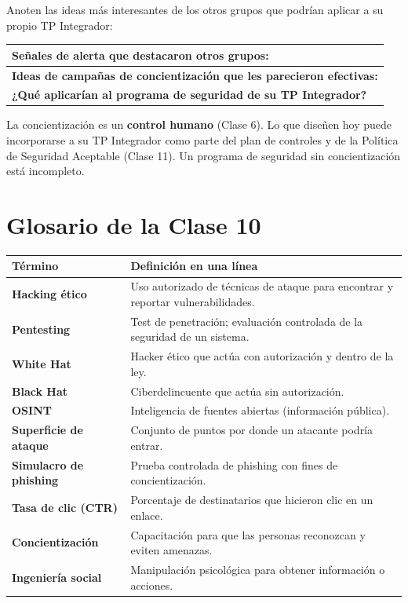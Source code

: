 \documentclass[12pt,a4paper]{article}
\renewcommand{\arraystretch}{1.25}
\begin{document}
\begin{cajaActividad}[title={Registro de la puesta en com\'un}]
Anoten las ideas m\'as interesantes de los otros grupos que podr\'ian aplicar a su propio TP Integrador:
\end{cajaActividad}
\vspace{4pt}
\renewcommand{\arraystretch}{1.6}
\begin{tabularx}{\textwidth}{|X|}
\hline
\textbf{Se\~nales de alerta que destacaron otros grupos:} \\[3cm]
\hline
\textbf{Ideas de campa\~nas de concientizaci\'on que les parecieron efectivas:} \\[3cm]
\hline
\textbf{¿Qu\'e aplicar\'ian al programa de seguridad de su TP Integrador?} \\[2.5cm]
\hline
\end{tabularx}

\begin{cajaNota}[title={Conexi\'on con el TP Integrador}]
La concientizaci\'on es un \textbf{control humano} (Clase 6). Lo que dise\~nen hoy puede incorporarse a su TP Integrador como parte del plan de controles y de la Pol\'itica de Seguridad Aceptable (Clase 11). Un programa de seguridad sin concientizaci\'on est\'a incompleto.
\end{cajaNota}

\newpage
\section{Glosario de la Clase 10}

\renewcommand{\arraystretch}{1.4}
\begin{tabularx}{\textwidth}{>{\bfseries}p{4.5cm}X}
\toprule
\textbf{T\'ermino} & \textbf{Definici\'on en una l\'inea} \\
\midrule
Hacking \'etico & Uso autorizado de t\'ecnicas de ataque para encontrar y reportar vulnerabilidades. \\
Pentesting & Test de penetraci\'on; evaluaci\'on controlada de la seguridad de un sistema. \\
White Hat & Hacker \'etico que act\'ua con autorizaci\'on y dentro de la ley. \\
Black Hat & Ciberdelincuente que act\'ua sin autorizaci\'on. \\
OSINT & Inteligencia de fuentes abiertas (informaci\'on p\'ublica). \\
Superficie de ataque & Conjunto de puntos por donde un atacante podr\'ia entrar. \\
Simulacro de phishing & Prueba controlada de phishing con fines de concientizaci\'on. \\
Tasa de clic (CTR) & Porcentaje de destinatarios que hicieron clic en un enlace. \\
Concientizaci\'on & Capacitaci\'on para que las personas reconozcan y eviten amenazas. \\
Ingenier\'ia social & Manipulaci\'on psicol\'ogica para obtener informaci\'on o acciones. \\
\bottomrule
\end{tabularx}
\end{document}
